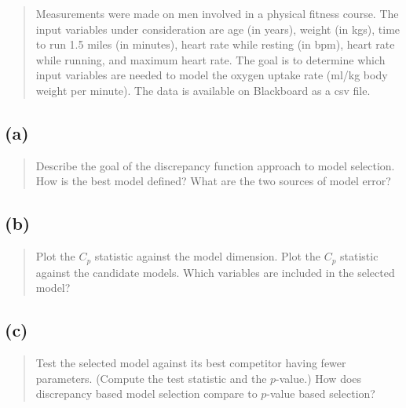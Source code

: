 \documentclass[
]{article}
\begin{document}
\begin{quote}
Measurements were made on men involved in a physical fitness course. The
input variables under consideration are age (in years), weight (in kgs),
time to run 1.5 miles (in minutes), heart rate while resting (in bpm),
heart rate while running, and maximum heart rate. The goal is to
determine which input variables are needed to model the oxygen uptake
rate (ml/kg body weight per minute). The data is available on Blackboard
as a csv file.
\end{quote}

\vspace{50pt}

\hypertarget{a-1}{%
\subsection{(a)}\label{a-1}}

\begin{quote}
Describe the goal of the discrepancy function approach to model
selection. How is the best model defined? What are the two sources of
model error?
\end{quote}

\vspace{50pt}

\hypertarget{b-1}{%
\subsection{(b)}\label{b-1}}

\begin{quote}
Plot the \(C_p\) statistic against the model dimension. Plot the \(C_p\)
statistic against the candidate models. Which variables are included in
the selected model?
\end{quote}

\vspace{50pt}

\hypertarget{c-1}{%
\subsection{(c)}\label{c-1}}

\begin{quote}
Test the selected model against its best competitor having fewer
parameters. (Compute the test statistic and the \(p\)-value.) How does
discrepancy based model selection compare to \(p\)-value based
selection?
\end{quote}
\end{document}

